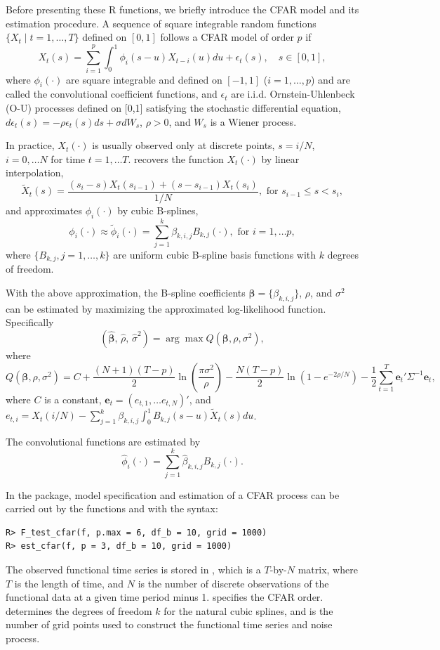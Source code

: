 Before presenting these {R} functions, we briefly introduce the CFAR model and its estimation procedure. A sequence of square integrable random functions $\{X_t\mid t=1,\ldots, T\}$ defined on $[0,1]$ follows a CFAR model of order $p$ if
\[
X_t(s)=\sum_{i=1}^p \int_0^1 \phi_i(s-u)X_{t-i}(u)du +\epsilon_t(s), \quad s\in[0,1],
\]
where $\phi_i(\cdot)$ are square integrable and defined on $[-1,1]$ ($i=1,\ldots,p$) and are called the convolutional coefficient functions, and $\epsilon_t$ are i.i.d. Ornstein-Uhlenbeck (O-U) processes defined on [0,1] satisfying the stochastic differential equation, $d\epsilon_t(s)=-\rho \epsilon_t(s)ds+\sigma dW_s$, $\rho>0$, and $W_s$ is a Wiener process.

In practice, $X_t(\cdot)$ is usually observed only at discrete points, $s=i/N$, $i=0,\ldots N$ for time $t=1,\ldots T$. \cite{liu2016functional} recovers the function $X_t(\cdot)$ by linear interpolation,
\[
\widetilde{X}_t(s)=\frac{(s_i-s)X_t(s_{i-1})+(s-s_{i-1})X_t(s_i)}{1/N}, \mbox{ for } s_{i-1}\leq s< s_i,
\]
and approximates $\phi_i(\cdot)$ by cubic B-splines,
\[
\phi_i(\cdot) \approx \widetilde{\phi}_i(\cdot)=\sum_{j=1}^k {\beta}_{k,i,j}B_{k,j}(\cdot), \mbox{ for } i=1,\ldots p,
\]
where $\{B_{k,j},j=1,\ldots,k\}$ are uniform cubic B-spline basis functions with $k$ degrees of freedom.

With the above approximation, the B-spline coefficients $\boldsymbol{\beta}=\{{\beta}_{k,i,j}\}$, $\rho$, and $\sigma^2$ can be estimated by maximizing the approximated log-likelihood function. Specifically
\[
(\hat{{\boldsymbol{\beta}}},\, \hat{\rho},\, \hat{\sigma}^2)=\arg \max Q(\boldsymbol{\beta}, \rho,\sigma^2),
\]
where
\[
Q(\boldsymbol{\beta}, \rho,\sigma^2)=C+\frac{(N+1)(T-p)}{2}\ln \left(\frac{\pi \sigma^2}{\rho}\right)-\frac{N(T-p)}{2}\ln (1-e^{-2\rho/N}) -\frac{1}{2}\sum_{t=1}^T \mathbf{e}_t' \Sigma^{-1} \mathbf{e}_t,
\]
where $C$ is a constant, $\mathbf{e}_t=(e_{t,1},\ldots e_{t,N})'$, and $e_{t,i}=X_t(i/N)-\sum_{j=1}^k {\beta}_{k,i,j} \int_0^1 B_{k,j}(s-u) \widetilde{X}_t(s)du$.

The convolutional functions are estimated by
\[
\hat{\phi}_i(\cdot)=\sum_{j=1}^k \hat{\beta}_{k,i,j}B_{k,j}(\cdot).
\]

In the  package, model specification and estimation of a CFAR process can be carried out by the functions  and  with the syntax:
\begin{verbatim}
R> F_test_cfar(f, p.max = 6, df_b = 10, grid = 1000)
R> est_cfar(f, p = 3, df_b = 10, grid = 1000)
\end{verbatim}
The observed functional time series is stored in , which is a $T$-by-$N$ matrix, where $T$ is the length of time, and $N$ is the number of discrete observations of the functional data at a given time period minus 1.  specifies the CFAR order.   determines the degrees of freedom $k$ for
the natural cubic splines, and  is the number of grid points used to construct the functional time series and noise process.

